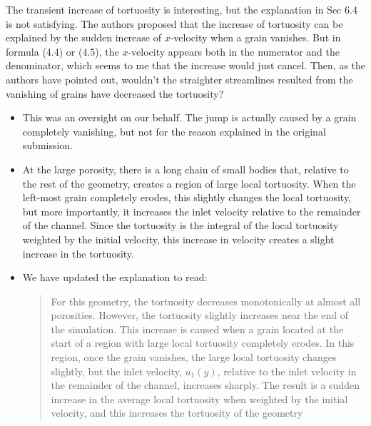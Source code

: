 \documentclass[11pt]{article}
\newcommand{\comment}[1]{{\color{blue} #1}}
\begin{document}
\noindent
\comment{The transient increase of tortuosity is interesting, but the
explanation in Sec 6.4 is not satisfying. The authors proposed that the
increase of tortuosity can be explained by the sudden increase of
$x$-velocity when a grain vanishes. But in formula (4.4) or (4.5), the
$x$-velocity appears both in the numerator and the denominator, which
seems to me that the increase would just cancel. Then, as the authors
have pointed out, wouldn't the straighter streamlines resulted from the
vanishing of grains have decreased the tortuosity?}
\begin{itemize}
  \item This was an oversight on our behalf. The jump is actually caused
    by a grain completely vanishing, but not for the reason explained in
    the original submission. 
    
  \item At the large porosity, there is a long chain of small bodies
    that, relative to the rest of the geometry, creates a region of
    large local tortuosity. When the left-most grain completely erodes,
    this slightly changes the local tortuosity, but more importantly, it
    increases the inlet velocity relative to the remainder of the
    channel. Since the tortuosity is the integral of the local
    tortuosity weighted by the initial velocity, this increase in
    velocity creates a slight increase in the tortuosity.

  \item We have updated the explanation to read:
    \begin{quotation}
      \noindent
      For this geometry, the tortuosity decreases monotonically at
      almost all porosities. However, the tortuosity slightly increases
      near the end of the simulation. This increase is caused when a
      grain located at the start of a region with large local tortuosity
      completely erodes.  In this region, once the grain vanishes, the
      large local tortuosity changes slightly, but the inlet velocity,
      $u_1(y)$, relative to the inlet velocity in the remainder of the
      channel, increases sharply. The result is a sudden increase in the
      average local tortuosity when weighted by the initial velocity,
      and this increases the tortuosity of the geometry
    \end{quotation}
\end{itemize}
\end{document}
